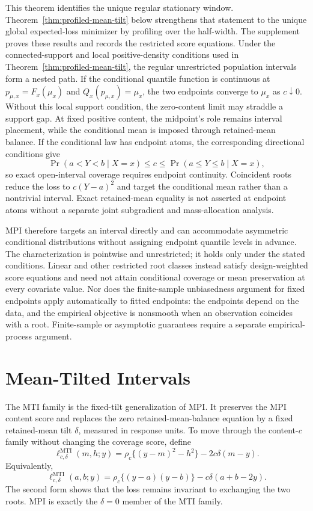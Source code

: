 \documentclass[11pt]{article}
\numberwithin{equation}{section}
\begin{document}
This theorem identifies the unique regular stationary window.
Theorem~\ref{thm:profiled-mean-tilt} below strengthens that statement to
the unique global expected-loss minimizer by profiling over the half-width.
The supplement proves these results and records the restricted score
equations. Under the connected-support and local positive-density conditions
used in Theorem~\ref{thm:profiled-mean-tilt}, the regular unrestricted
population intervals form a nested path. If the conditional quantile function
is continuous at \(p_{\mu,x}=F_x(\mu_x)\) and
\(Q_x(p_{\mu,x})=\mu_x\), the two endpoints converge to \(\mu_x\) as
\(c\downarrow0\). Without this local support condition, the zero-content
limit may straddle a support gap. At fixed positive content, the midpoint's
role remains interval placement, while the conditional mean is imposed through
retained-mean balance. If the
conditional law has endpoint atoms,
the corresponding directional conditions give
\[
\Pr(a<Y<b\mid X=x)\le c\le\Pr(a\le Y\le b\mid X=x),
\]
so exact open-interval coverage requires endpoint continuity. Coincident roots
reduce the loss to \(c(Y-a)^2\) and target the conditional mean rather than a
nontrivial interval. Exact retained-mean equality is not asserted at endpoint
atoms without a separate joint subgradient and mass-allocation analysis.

MPI therefore targets an interval directly and can accommodate asymmetric
conditional distributions without assigning endpoint quantile levels in
advance. The characterization is pointwise and unrestricted; it holds only
under the stated conditions. Linear and other restricted root classes instead
satisfy design-weighted score equations and need not attain conditional
coverage or mean preservation at every covariate value. Nor does the
finite-sample unbiasedness argument for fixed endpoints apply automatically to
fitted endpoints: the endpoints depend on the data, and the empirical
objective is nonsmooth when an observation coincides with a root. Finite-sample
or asymptotic guarantees require a separate empirical-process argument.

\section{Mean-Tilted Intervals}
\label{sec:mti-loss}

The MTI family is the fixed-tilt generalization of MPI. It preserves the MPI
content score and replaces the zero retained-mean-balance equation by a fixed
retained-mean tilt \(\delta\), measured in response units. To move through the
content-\(c\) family without changing the coverage score, define
\[
\ell_{c,\delta}^{\mathrm{MTI}}(m,h;y)
=
\rho_c\{(y-m)^2-h^2\}-2c\delta(m-y).
\]
Equivalently,
\[
\ell_{c,\delta}^{\mathrm{MTI}}(a,b;y)
=
\rho_c\{(y-a)(y-b)\}-c\delta(a+b-2y).
\]
The second form shows that the loss remains invariant to exchanging the two
roots. MPI is exactly the \(\delta=0\) member of the MTI family.
\end{document}
